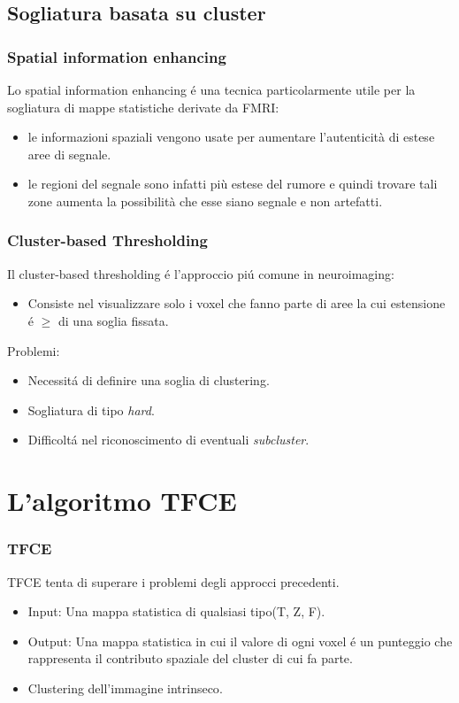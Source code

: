 \documentclass{beamer}
\begin{document}
\subsection{Sogliatura basata su cluster}
\begin{frame}
\frametitle{Spatial information enhancing}
Lo spatial information enhancing \'e una tecnica particolarmente utile per la sogliatura di mappe statistiche derivate da FMRI:
\smallskip
\begin{itemize}

\item le informazioni spaziali vengono usate per aumentare l'autenticità di estese aree di segnale. 
\medskip
\item le regioni del segnale sono infatti più estese del rumore e quindi trovare tali zone aumenta la possibilità che esse siano segnale e non artefatti.
\end{itemize}

\end{frame}

\begin{frame}
\frametitle{Cluster-based Thresholding}
Il cluster-based thresholding \'e l'approccio pi\'u comune in neuroimaging:
\smallskip
\begin{itemize}
\item Consiste nel visualizzare solo i voxel che fanno parte di aree la cui estensione \'e $\geq$ di una soglia fissata. 
\medskip
\end{itemize}
Problemi:
\begin{itemize}
\item Necessit\'a di definire una soglia di clustering.
\item Sogliatura di tipo \emph{hard}.
\item Difficolt\'a nel riconoscimento di eventuali \emph{subcluster}.
\end{itemize}
\end{frame}

\section{L'algoritmo TFCE}
\begin{frame}
\frametitle{TFCE}
TFCE tenta di superare i problemi degli approcci precedenti.
\begin{itemize}
\item Input: Una mappa statistica di qualsiasi tipo(T, Z, F).
\item Output: Una mappa statistica in cui il valore di ogni voxel \'e un \alert{punteggio} che rappresenta il contributo spaziale del cluster di cui fa parte.
\end{itemize}
\bigskip
\begin{itemize}
\item Clustering dell'immagine \alert{intrinseco}.
\end{itemize}
\end{frame}
\end{document}
